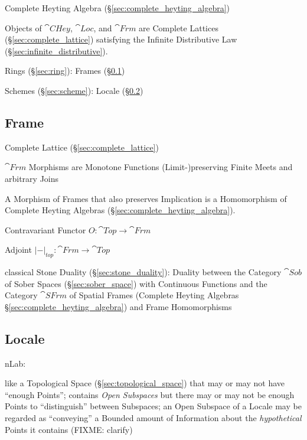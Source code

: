 Complete Heyting Algebra (\S\ref{sec:complete_heyting_algebra})

Objects of $\cat{CHey}$, $\cat{Loc}$, and $\cat{Frm}$ are Complete
Lattices (\S\ref{sec:complete_lattice}) satisfying the Infinite
Distributive Law (\S\ref{sec:infinite_distributive}).

Rings (\S\ref{sec:ring}): Frames (\S\ref{sec:frame})

Schemes (\S\ref{sec:scheme}): Locale (\S\ref{sec:locale})



\subsection{Frame}\label{sec:frame}

Complete Lattice (\S\ref{sec:complete_lattice})

$\cat{Frm}$ Morphisms are Monotone Functions (Limit-)preserving Finite
Meets and arbitrary Joins

A Morphism of Frames that also preserves Implication is a Homomorphism
of Complete Heyting Algebras (\S\ref{sec:complete_heyting_algebra}).

Contravariant Functor $O : \cat{Top} \rightarrow \cat{Frm}$

Adjoint $|-|_{top} : \cat{Frm} \rightarrow \cat{Top}$ %

classical Stone Duality (\S\ref{sec:stone_duality}): Duality between the
Category $\cat{Sob}$ of Sober Spaces (\S\ref{sec:sober_space}) with Continuous
Functions and the Category $\cat{SFrm}$ of Spatial Frames (Complete Heyting
Algebras \S\ref{sec:complete_heyting_algebra}) and Frame Homomorphisms



\subsection{Locale}\label{sec:locale}

nLab:

like a Topological Space (\S\ref{sec:topological_space}) that may or may not
have ``enough Points''; contains \emph{Open Subspaces} but there may or may not
be enough Points to ``distinguish'' between Subspaces; an Open Subspace of a
Locale may be regarded as ``conveying'' a Bounded amount of Information about
the \emph{hypothetical} Points it contains (FIXME: clarify)

